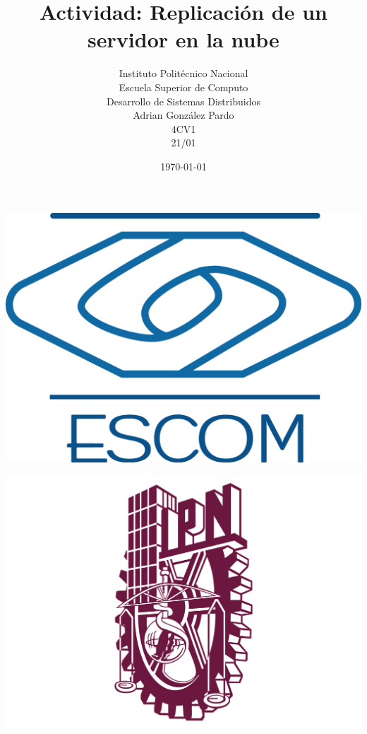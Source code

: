 \documentclass[10pt,executivepaper]{article}
\title{Actividad: Replicación de un servidor en la nube}
\author{Instituto Politécnico Nacional\\Escuela Superior de Computo\\Desarrollo de Sistemas Distribuidos\\Adrian González Pardo\\4CV1\\21/01}
\date{\today}
\begin{document}
\begin{minipage}{0.4\textwidth}
	\begin{flushleft}
		\includegraphics[scale = 0.05]{logoescom.png}
	\end{flushleft}
\end{minipage}
\begin{minipage}{0.51\textwidth}
	\begin{flushright}
		\includegraphics[scale = 0.055]{logoipn.png}
	\end{flushright}
\end{minipage}
\end{document}
